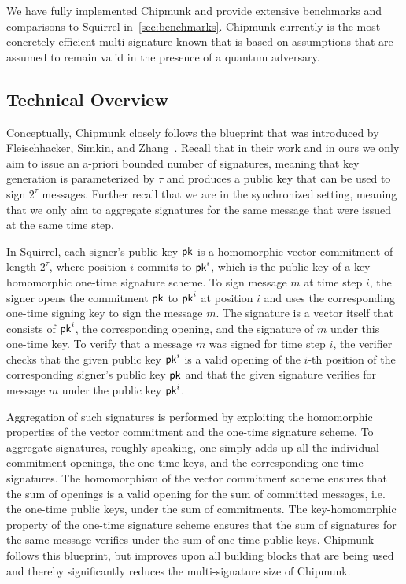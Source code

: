 We have fully implemented Chipmunk and provide extensive benchmarks and comparisons to Squirrel in~\autoref{sec:benchmarks}.
Chipmunk currently is the most concretely efficient multi-signature known that is based on assumptions that are assumed to remain valid in the presence of a quantum adversary.

\subsection{Technical Overview}

Conceptually, Chipmunk closely follows the blueprint that was introduced by Fleischhacker, Simkin, and Zhang~\cite{CCS:FleSimZha22}.
Recall that in their work and in ours we only aim to issue an a-priori bounded number of signatures, meaning that key generation is parameterized by $\tau$ and produces a public key that can be used to sign $2^\tau$ messages.
Further recall that we are in the synchronized setting, meaning that we only aim to aggregate signatures for the same message that were issued at the same time step.

In Squirrel, each signer's public key $\mathsf{pk}$ is a homomorphic vector commitment of length $2^\tau$, where position $i$ commits to $\mathsf{pk}^i$, which is the public key of a key-homomorphic one-time signature scheme.
To sign message $m$ at time step $i$, the signer opens the commitment $\mathsf{pk}$ to $\mathsf{pk}^i$ at position $i$ and uses the corresponding one-time signing key to sign the message $m$.
The signature is a vector itself that consists of $\mathsf{pk}^i$, the corresponding opening, and the signature of $m$ under this one-time key.
To verify that a message $m$ was signed for time step $i$, the verifier checks that the given public key $\mathsf{pk}^i$ is a valid opening of the $i$-th position of the corresponding signer's public key $\mathsf{pk}$ and that the given signature verifies for message $m$ under the public key $\mathsf{pk}^i$.

Aggregation of such signatures is performed by exploiting the homomorphic properties of the vector commitment and the one-time signature scheme.
To aggregate signatures, roughly speaking, one simply adds up all the individual commitment openings, the one-time keys, and the corresponding one-time signatures.
The homomorphism of the vector commitment scheme ensures that the sum of openings is a valid opening for the sum of committed messages, i.e. the one-time public keys, under the sum of commitments.
The key-homomorphic property of the one-time signature scheme ensures that the sum of signatures for the same message verifies under the sum of one-time public keys.
Chipmunk follows this blueprint, but improves upon all building blocks that are being used and thereby significantly reduces the multi-signature size of Chipmunk.

